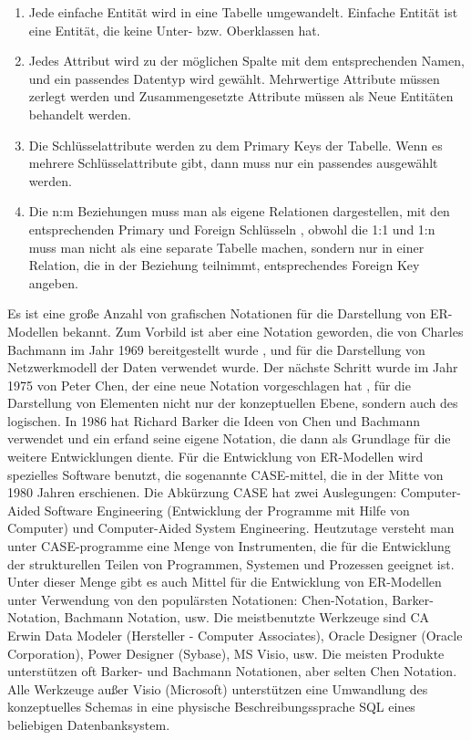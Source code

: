     
\begin{enumerate}
\item  Jede einfache Entität wird in eine Tabelle umgewandelt. Einfache Entität ist eine Entität, die keine Unter- bzw. Oberklassen hat.
\item  Jedes Attribut wird zu der möglichen Spalte mit dem entsprechenden Namen, und ein passendes Datentyp wird gewählt. Mehrwertige Attribute müssen zerlegt werden und Zusammengesetzte Attribute müssen als Neue Entitäten behandelt werden. 
\item  Die Schlüsselattribute werden zu dem Primary Keys der Tabelle. Wenn es mehrere Schlüsselattribute gibt, dann muss nur ein passendes ausgewählt werden. 
\item  Die n:m Beziehungen muss man als eigene Relationen dargestellen, mit den entsprechenden Primary und Foreign Schlüsseln , obwohl die 1:1 und 1:n muss man nicht als eine separate Tabelle machen, sondern nur in einer Relation, die in der Beziehung teilnimmt, entsprechendes Foreign Key angeben.
\end{enumerate}


Es ist eine große Anzahl von grafischen Notationen für die Darstellung von ER-Modellen bekannt. Zum Vorbild ist aber eine Notation geworden, die von Charles Bachmann im Jahr 1969 bereitgestellt wurde \cite{bachman1969data}, und für die Darstellung von Netzwerkmodell der Daten verwendet wurde. Der nächste Schritt wurde im Jahr 1975 von  Peter Chen, der eine neue Notation vorgeschlagen hat \cite{barker1990case}, für die Darstellung von Elementen nicht nur der konzeptuellen Ebene, sondern auch des logischen. In 1986 hat Richard Barker die Ideen von Chen und Bachmann verwendet und ein erfand seine eigene Notation, die dann als Grundlage für die weitere Entwicklungen diente. Für die Entwicklung von ER-Modellen wird spezielles Software benutzt, die sogenannte CASE-mittel, die in der Mitte von 1980 Jahren erschienen. Die Abkürzung CASE hat zwei Auslegungen: Computer-Aided Software Engineering (Entwicklung der Programme mit Hilfe von Computer) und Computer-Aided System Engineering. Heutzutage versteht man unter CASE-programme eine Menge von Instrumenten, die für die Entwicklung der strukturellen Teilen von Programmen, Systemen und Prozessen geeignet ist. Unter dieser Menge gibt es auch Mittel für die Entwicklung von ER-Modellen unter Verwendung von den populärsten Notationen: Chen-Notation, Barker-Notation, Bachmann Notation, usw. Die meistbenutzte  Werkzeuge sind CA Erwin Data Modeler (Hersteller - Computer Associates), Oracle Designer (Oracle Corporation), Power Designer (Sybase), MS Visio, usw. Die meisten Produkte unterstützen oft Barker- und Bachmann Notationen, aber selten Chen Notation. Alle Werkzeuge außer Visio (Microsoft) unterstützen eine Umwandlung des konzeptuelles Schemas in eine physische Beschreibungssprache SQL eines beliebigen Datenbanksystem. 

